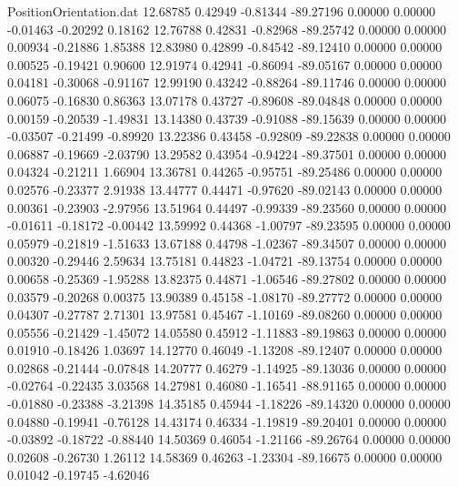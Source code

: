 \begin{filecontents}{PositionOrientation.dat}
  12.68785    0.42949   -0.81344   -89.27196    0.00000    0.00000   -0.01463   -0.20292    0.18162
  12.76788    0.42831   -0.82968   -89.25742    0.00000    0.00000    0.00934   -0.21886    1.85388
  12.83980    0.42899   -0.84542   -89.12410    0.00000    0.00000    0.00525   -0.19421    0.90600
  12.91974    0.42941   -0.86094   -89.05167    0.00000    0.00000    0.04181   -0.30068   -0.91167
  12.99190    0.43242   -0.88264   -89.11746    0.00000    0.00000    0.06075   -0.16830    0.86363
  13.07178    0.43727   -0.89608   -89.04848    0.00000    0.00000    0.00159   -0.20539   -1.49831
  13.14380    0.43739   -0.91088   -89.15639    0.00000    0.00000   -0.03507   -0.21499   -0.89920
  13.22386    0.43458   -0.92809   -89.22838    0.00000    0.00000    0.06887   -0.19669   -2.03790
  13.29582    0.43954   -0.94224   -89.37501    0.00000    0.00000    0.04324   -0.21211    1.66904
  13.36781    0.44265   -0.95751   -89.25486    0.00000    0.00000    0.02576   -0.23377    2.91938
  13.44777    0.44471   -0.97620   -89.02143    0.00000    0.00000    0.00361   -0.23903   -2.97956
  13.51964    0.44497   -0.99339   -89.23560    0.00000    0.00000   -0.01611   -0.18172   -0.00442
  13.59992    0.44368   -1.00797   -89.23595    0.00000    0.00000    0.05979   -0.21819   -1.51633
  13.67188    0.44798   -1.02367   -89.34507    0.00000    0.00000    0.00320   -0.29446    2.59634
  13.75181    0.44823   -1.04721   -89.13754    0.00000    0.00000    0.00658   -0.25369   -1.95288
  13.82375    0.44871   -1.06546   -89.27802    0.00000    0.00000    0.03579   -0.20268    0.00375
  13.90389    0.45158   -1.08170   -89.27772    0.00000    0.00000    0.04307   -0.27787    2.71301
  13.97581    0.45467   -1.10169   -89.08260    0.00000    0.00000    0.05556   -0.21429   -1.45072
  14.05580    0.45912   -1.11883   -89.19863    0.00000    0.00000    0.01910   -0.18426    1.03697
  14.12770    0.46049   -1.13208   -89.12407    0.00000    0.00000    0.02868   -0.21444   -0.07848
  14.20777    0.46279   -1.14925   -89.13036    0.00000    0.00000   -0.02764   -0.22435    3.03568
  14.27981    0.46080   -1.16541   -88.91165    0.00000    0.00000   -0.01880   -0.23388   -3.21398
  14.35185    0.45944   -1.18226   -89.14320    0.00000    0.00000    0.04880   -0.19941   -0.76128
  14.43174    0.46334   -1.19819   -89.20401    0.00000    0.00000   -0.03892   -0.18722   -0.88440
  14.50369    0.46054   -1.21166   -89.26764    0.00000    0.00000    0.02608   -0.26730    1.26112
  14.58369    0.46263   -1.23304   -89.16675    0.00000    0.00000    0.01042   -0.19745   -4.62046

\end{filecontents}
